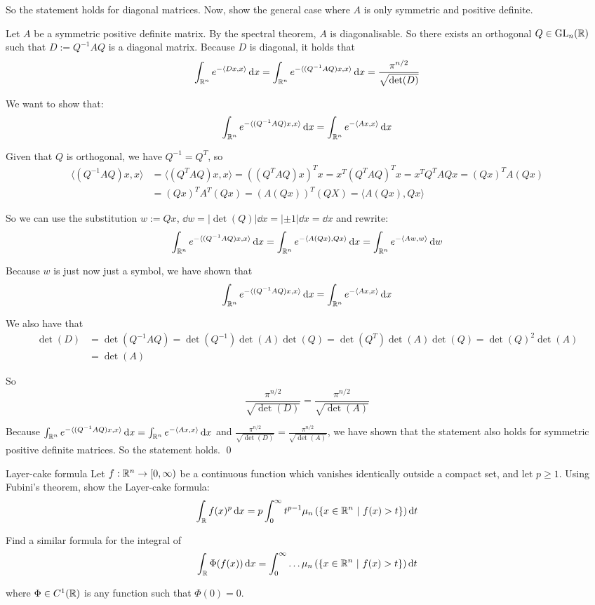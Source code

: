 \documentclass[12pt]{article}
\begin{document}
So the statement holds for diagonal matrices. Now, show the general case where $A$ is only symmetric and positive definite. 

Let $A$ be a symmetric positive definite matrix. By the spectral theorem, $A$ is diagonalisable. So there exists an orthogonal $Q \in \mathrm{GL}_n(\mathbb{R})$ such that $D := Q^{-1}AQ$ is a diagonal matrix. Because $D$ is diagonal, it holds that
$$
    \int_{\mathbb{R}^n} e^{-\langle Dx, x \rangle}\mathop{}\!\mathrm{d} x = \int_{\mathbb{R}^n} e^{-\langle (Q^{-1}AQ)x, x \rangle}\mathop{}\!\mathrm{d} x = \frac{\pi^{n/2}}{\sqrt{\det(D)}}
$$

We want to show that:
$$
    \int_{\mathbb{R}^n} e^{-\langle (Q^{-1}AQ)x, x \rangle}\mathop{}\!\mathrm{d} x = \int_{\mathbb{R}^n} e^{-\langle Ax, x \rangle}\mathop{}\!\mathrm{d} x
$$

Given that $Q$ is orthogonal, we have $Q^{-1} = Q^T$, so
$$
\begin{aligned}
    \langle (Q^{-1}AQ)x, x \rangle &= \langle (Q^TAQ)x, x \rangle = ((Q^TAQ)x)^T x = x^T(Q^TAQ)^T x = x^T Q^T A Q x = (Qx)^T A (Qx) \\
    &= (Qx)^T A^T (Qx) = (A(Qx))^T (QX) = \langle A(Qx), Qx \rangle
\end{aligned}
$$

So we can use the substitution $w := Qx$, $\dd w = |\det(Q)| \dd x = |\pm 1| \dd x = \dd x$ and rewrite:
$$
    \int_{\mathbb{R}^n} e^{-\langle (Q^{-1}AQ)x, x \rangle}\mathop{}\!\mathrm{d} x = \int_{\mathbb{R}^n} e^{-\langle A(Qx), Qx \rangle}\mathop{}\!\mathrm{d} x = \int_{\mathbb{R}^n} e^{-\langle Aw, w \rangle}\mathop{}\!\mathrm{d} w
$$

Because $w$ is just now just a symbol, we have shown that
$$
    \int_{\mathbb{R}^n} e^{-\langle (Q^{-1}AQ)x, x \rangle}\mathop{}\!\mathrm{d} x = \int_{\mathbb{R}^n} e^{-\langle Ax, x \rangle}\mathop{}\!\mathrm{d} x
$$

We also have that
$$
\begin{aligned}
    \det(D) &= \det(Q^{-1}AQ) = \det(Q^{-1})\det(A)\det(Q) = \det(Q^T)\det(A)\det(Q) = \det(Q)^2\det(A) \\
    &= \det(A)
\end{aligned}
$$

So
$$
    \frac{\pi^{n/2}}{\sqrt{\det(D)}} = \frac{\pi^{n/2}}{\sqrt{\det(A)}}
$$

Because $\int_{\mathbb{R}^n} e^{-\langle (Q^{-1}AQ)x, x \rangle}\mathop{}\!\mathrm{d} x = \int_{\mathbb{R}^n} e^{-\langle Ax, x \rangle}\mathop{}\!\mathrm{d} x$ and $\frac{\pi^{n/2}}{\sqrt{\det(D)}} = \frac{\pi^{n/2}}{\sqrt{\det(A)}}$, we have shown that the statement also holds for symmetric positive definite matrices. So the statement holds. \qed

\begin{problem}{Layer-cake formula}{}
    Let $f: \mathbb{R}^n \rightarrow [0, \infty)$ be a continuous function which vanishes identically outside a compact set, and let $p \geq 1$. Using Fubini's theorem, show the Layer-cake formula:
    $$
        \int_{\mathbb{R}} f(x)^p \mathop{}\!\mathrm{d} x = p \int_{0}^{\infty} t^{p-1} \mu_n \left(\left\{ x \in \mathbb{R}^n \ |\ f(x) > t \right\}\right) \mathop{}\!\mathrm{d} t
    $$

    Find a similar formula for the integral of
    $$
        \int_{\mathbb{R}} \Phi(f(x)) \mathop{}\!\mathrm{d} x = \int_{0}^{\infty} \dots \mu_n\left( \left\{x \in \mathbb{R}^n \ |\ f(x) > t\right\}\right) \mathop{}\!\mathrm{d} t
    $$

    where $\Phi \in C^1(\mathbb{R})$ is any function such that $\Phi(0) = 0$.
\end{problem}
\end{document}
